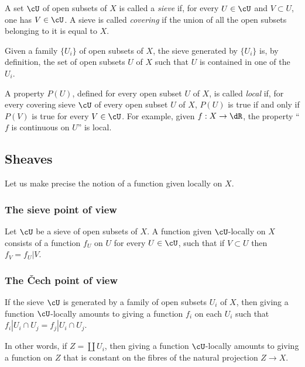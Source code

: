 \documentclass[oneside]{book}
\begin{document}
A set $\cU$ of open subsets of $X$ is called a \emph{sieve} if, for every
$U\in\cU$ and $V\subset U$, one has $V\in\cU$. A sieve is called
\emph{covering} if the union of all the open subsets belonging to it is
equal to $X$.

Given a family $\{U_i\}$ of open subsets of $X$, the sieve generated by
$\{U_i\}$ is, by definition, the set of open subsets $U$ of $X$ such that
$U$ is contained in one of the $U_i$.

A property $P(U)$, defined for every open subset $U$ of $X$, is called
\emph{local} if, for every covering sieve $\cU$ of every open subset $U$
of $X$, $P(U)$ is true if and only if $P(V)$ is true for every
$V\in \cU$. For example, given $f:X\to \dR$, the property “$f$ is
continuous on $U$” is local.

\subsection{Sheaves}\label{I:1-2}

Let us make precise the notion of a function given locally on $X$.

\subsubsection{The sieve point of view}\label{I:1-2-1}

Let $\cU$ be a sieve of open subsets of $X$. A function given
$\cU$-locally on $X$ consists of a function $f_U$ on $U$ for every
$U\in \cU$, such that if $V\subset U$ then $f_V=f_U|V$.

\subsubsection{The Čech point of view}\label{I:1-2-2}

If the sieve $\cU$ is generated by a family of open subsets $U_i$ of $X$,
then giving a function $\cU$-locally amounts to giving a function $f_i$
on each $U_i$ such that
$f_i|{U_i\cap U_j} = f_j|{U_i\cap U_j}$.

In other words, if $Z=\coprod U_i$, then giving a function
$\cU$-locally amounts to giving a function on $Z$ that is constant on the
fibres of the natural projection $Z\to X$.

\subsubsection{}\label{I:1-2-3}
\end{document}
